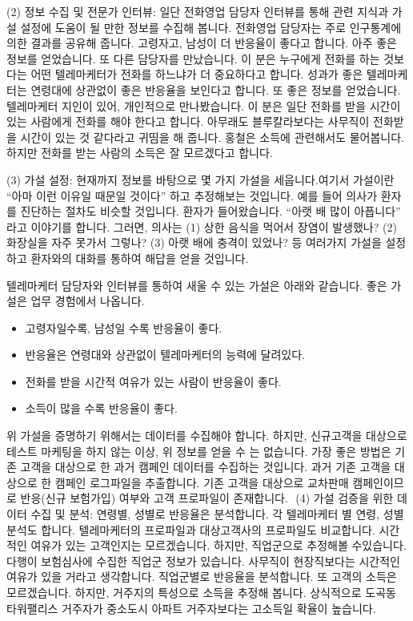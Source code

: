 \documentclass[letterpaper,10pt,english]{jupyterBook}
\begin{document}
\sphinxAtStartPar
(2) 정보 수집 및 전문가 인터뷰: 일단 전화영업 담당자 인터뷰를 통해 관련 지식과 가설 설정에 도움이 될 만한 정보를 수집해 봅니다. 전화영업 담당자는 주로 인구통계에 의한 결과를 공유해 줍니다. 고령자고, 남성이 더 반응율이 좋다고 합니다. 아주 좋은 정보를 얻었습니다. 또 다른 담당자를 만났습니다. 이 분은 누구에게 전화를 하는 것보다는 어떤 텔레마케터가 전화를 하느냐가 더 중요하다고 합니다. 성과가 좋은 텔레마케터는 연령대에 상관없이 좋은 반응율을 보인다고 합니다. 또 좋은 정보를 얻었습니다. 텔레마케터 지인이 있어, 개인적으로 만나봤습니다. 이 분은 일단 전화를 받을 시간이 있는 사람에게 전화를 해야 한다고 합니다. 아무래도 블루칼라보다는 사무직이 전화받을 시간이 있는 것 같다라고 귀띰을 해 줍니다. 홍철은 소득에 관련해서도 물어봅니다. 하지만 전화를 받는 사람의 소득은 잘 모르겠다고 합니다.

\sphinxAtStartPar
(3)  가설 설정: 현재까지 정보를 바탕으로 몇 가지 가설을 세웁니다.​ 여기서 가설이란 “아마 이런 이유일 때문일 것이다” 하고 추정해보는 것입니다. 예를 들어 의사가 환자를 진단하는 절차도 비슷할 것입니다. 환자가 들어왔습니다. “아랫 배 많이 아픕니다” 라고 이야기를 합니다. 그러면, 의사는 (1) 상한 음식을 먹어서 장염이 발생했나? (2) 화장실을 자주 못가서 그렇나? (3) 아랫 배에 충격이 있었나? 등 여러가지 가설을 설정하고 환자와의 대화를 통하여 해답을 얻을 것입니다.

\sphinxAtStartPar
텔레마케터 담당자와 인터뷰를 통하여 새울 수 있는 가설은 아래와 같습니다. 좋은 가설은 업무 경험에서 나옵니다.
\begin{itemize}
\item {} 
\sphinxAtStartPar
고령자일수록, 남성일 수록 반응율이 좋다.

\item {} 
\sphinxAtStartPar
반응율은 연령대와 상관없이 텔레마케터의 능력에 달려있다.

\item {} 
\sphinxAtStartPar
전화를 받을 시간적 여유가 있는 사람이 반응율이 좋다.

\item {} 
\sphinxAtStartPar
소득이 많을 수록 반응율이 좋다.

\end{itemize}

\sphinxAtStartPar
위 가설을 증명하기 위해서는 데이터를 수집해야 합니다. 하지만, 신규고객을 대상으로 테스트 마케팅을 하지 않는 이상, 위 정보를 얻을 수 는 없습니다. 가장 좋은 방법은 기존 고객을 대상으로 한 과거 캠페인 데이터를 수집하는 것입니다. 과거 기존 고객을 대상으로 한 캠페인 로그파일을 추출합니다. 기존 고객을 대상으로 교차판매 캠페인이므로 반응(신규 보험가입) 여부와 고객 프로파일이 존재합니다.
​
(4) 가설 검증을 위한 데이터 수집 및 분석:  연령별, 성별로 반응율은 분석합니다. 각 텔레마케터 별 연령, 성별 분석도 합니다. 텔레마케터의 프로파일과 대상고객사의 프로파일도 비교합니다. 시간적인 여유가 있는 고객인지는 모르겠습니다. 하지만, 직업군으로 추정해볼 수있습니다. 다행이 보험심사에 수집한 직업군 정보가 있습니다. 사무직이 현장직보다는 시간적인 여유가 있을 거라고 생각합니다. 직업군별로 반응율을 분석합니다. 또 고객의 소득은 모르겠습니다. 하지만, 거주지의 특성으로 소득을 추정해 봅니다. 상식적으로 도곡동 타워팰리스 거주자가 중소도시 아파트 거주자보다는 고소득일 확율이 높습니다.
\end{document}
